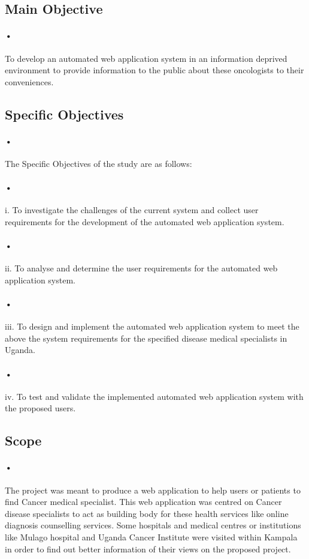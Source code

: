 \documentclass[12pt]{article}
\begin{document}
\subsection{Main Objective}
\paragraph{•}To develop an automated web application system in an information deprived environment to provide information to the public about these oncologists to their conveniences.


\subsection{Specific Objectives}
\paragraph{•}The Specific Objectives of the study are as follows:
\paragraph{•}i.	To investigate the challenges of the current system and collect user requirements for the development of the automated web application system.
\paragraph{•}ii.	To analyse and determine the user requirements for the automated web application system.
\paragraph{•}iii.	To design and implement the automated web application system to meet the above the system requirements for the specified disease medical specialists in Uganda.  
\paragraph{•}iv.	To test and validate the implemented automated web application system with the proposed users.


\subsection{Scope}
\paragraph{•}The project was meant to produce a web application to help users or patients to find Cancer medical specialist. This web application was centred on Cancer disease specialists to act as building body for these health services like online diagnosis counselling services. Some hospitals and medical centres or institutions like Mulago hospital and Uganda Cancer Institute were visited within Kampala in order to find out better information of their views on the proposed project.
\end{document}
